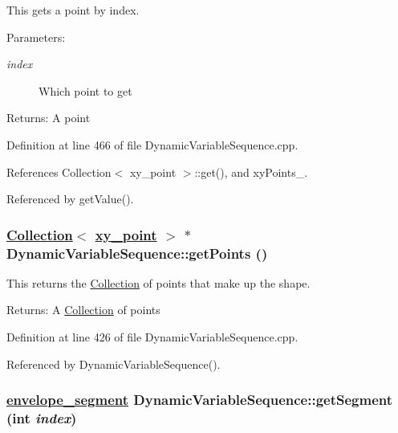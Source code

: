 This gets a point by index. \begin{Desc}
\item[Parameters:]
\begin{description}
\item[{\em index}]Which point to get \end{description}
\end{Desc}
\begin{Desc}
\item[Returns:]A point \end{Desc}


Definition at line 466 of file Dynamic\-Variable\-Sequence.cpp.

References Collection$<$ xy\_\-point $>$::get(), and xy\-Points\_\-.

Referenced by get\-Value().\hypertarget{classDynamicVariableSequence_a10}{
\subsubsection[getPoints]{\setlength{\rightskip}{0pt plus 5cm}\hyperlink{classCollection}{Collection}$<$ \hyperlink{structxy__point}{xy\_\-point} $>$ $\ast$ Dynamic\-Variable\-Sequence::get\-Points ()}}
\label{classDynamicVariableSequence_a10}


This returns the \hyperlink{classCollection}{Collection} of points that make up the shape. \begin{Desc}
\item[Returns:]A \hyperlink{classCollection}{Collection} of points \end{Desc}


Definition at line 426 of file Dynamic\-Variable\-Sequence.cpp.

Referenced by Dynamic\-Variable\-Sequence().\hypertarget{classDynamicVariableSequence_a13}{
\subsubsection[getSegment]{\setlength{\rightskip}{0pt plus 5cm}\hyperlink{structenvelope__segment}{envelope\_\-segment} Dynamic\-Variable\-Sequence::get\-Segment (int {\em index})}}
\label{classDynamicVariableSequence_a13}



